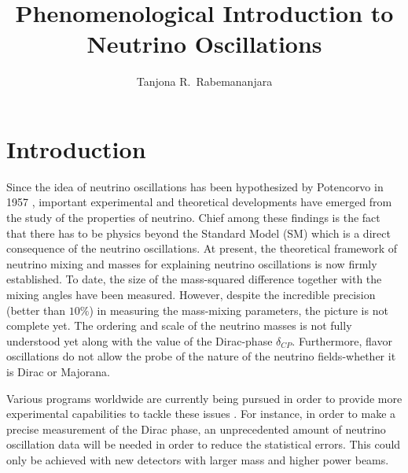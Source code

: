 \documentclass[twocolumn,secnumarabic,amssymb, nobibnotes, aps, prd,10pt]{revtex4-1}
\begin{document}
\title{\texorpdfstring{Phenomenological Introduction to Neutrino Oscillations}{Phenomenological Introduction to Neutrino Oscillations}}

\author{Tanjona R.\ Rabemananjara}

\maketitle

\section{Introduction}

Since the idea of neutrino oscillations has been hypothesized by Potencorvo in 1957
\cite{Potencorvo:1957cp, Xontecorvo:1957qd}, important experimental and theoretical
developments have emerged from the study of the properties of neutrino. Chief among
these findings is the fact that there has to be physics beyond the Standard Model 
(SM) which is a direct consequence of the neutrino oscillations. At present, the 
theoretical framework of neutrino mixing and masses for explaining neutrino
oscillations is now firmly established. To date, the size of the mass-squared 
difference together with the mixing angles have been measured. However, despite the
incredible precision (better than $10 \%$) in measuring the mass-mixing parameters, 
the picture is not complete yet. The ordering and scale of the neutrino masses is not
fully understood yet along with the value of the Dirac-phase $\delta_{CP}$. Furthermore, 
flavor oscillations do not allow the probe of the nature of the neutrino fields-whether 
it is Dirac or Majorana.

Various programs worldwide are currently being pursued in order to provide more
experimental capabilities to tackle these issues \cite{Acciarri:2015uup, Antonello:2015lea, 
An:2015jdp, Djurcic:2015vqa, Adamson:2016tbq, Kim:2014rfa, Adamson:2016xxw, Abe:2015awa,
Adams:2013qkq}. For instance, in order to make a precise measurement of the Dirac phase, an 
unprecedented amount of neutrino oscillation data will be needed in order to reduce the 
statistical errors. This could only be achieved with new detectors with larger mass and 
higher power beams.
\end{document}
